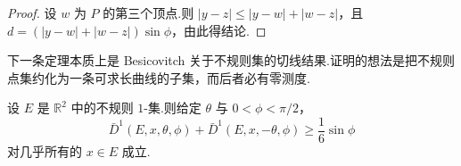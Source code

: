\begin{proof}
设 $w$ 为 $P$ 的第三个顶点.则 $|y-z|\leq|y-w|+|w-z|$，且 $d=(|y-w|+|w-z|)\sin\phi$，由此得结论.
\end{proof}

下一条定理本质上是 Besicovitch 关于不规则集的切线结果.证明的想法是把不规则点集约化为一条可求长曲线的子集，而后者必有零测度.

\begin{theorem}\label{thm:3.29}
设 $E$ 是 $\mathbb{R}^2$ 中的不规则 $1$-集.则给定 $\theta$ 与 $0<\phi<\pi/2$，
\begin{equation}\label{eq:3.19}
  \bar{D}^{1}(E,x,\theta,\phi)+\bar{D}^{1}(E,x,-\theta,\phi)\geq\frac{1}{6}\sin\phi
\end{equation}
对几乎所有的 $x\in E$ 成立.
\end{theorem}


